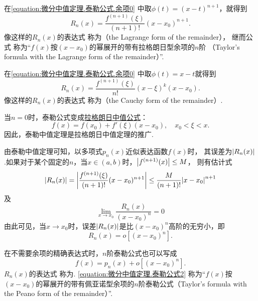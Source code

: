 在\cref{equation:微分中值定理.泰勒公式.余项0} 中取\(\phi(t) = (x-t)^{n+1}\)，就得到
\begin{equation}\label{equation:微分中值定理.泰勒公式.余项1}
R_n(x) = \frac{f^{(n+1)}(\xi)}{(n+1)!} (x-x_0)^{n+1}.
\end{equation}
像这样的\(R_n(x)\)的表达式 
称为（the Lagrange form of the remainder），
继而公式 
称为“\(f(x)\)按\((x-x_0)\)的幂展开的带有拉格朗日型余项的\(n\)阶
（Taylor's formula with the Lagrange form of the remainder）”.

在\cref{equation:微分中值定理.泰勒公式.余项0} 中取\(\phi(t) = x-t\)就得到
\begin{equation}\label{equation:微分中值定理.泰勒公式.余项4}
R_n(x) = \frac{f^{(n+1)}(\xi)}{n!} (x-\xi)^k (x-x_0).
\end{equation}
像这样的\(R_n(x)\)的表达式 
称为（the Cauchy form of the remainder）.

当\(n=0\)时，泰勒公式变成\hyperref[equation:微分中值定理.拉格朗日中值公式]{拉格朗日中值公式}：\[
	f(x) = f(x_0) + f'(\xi) (x-x_0), \quad x_0 < \xi < x.
\]
因此，泰勒中值定理是拉格朗日中值定理的推广.

由泰勒中值定理可知，以多项式\(p_n(x)\)近似表达函数\(f(x)\)时，
其误差为\(\abs{R_n(x)}\).如果对于某个固定的\(n\)，当\(x\in(a,b)\)时，\(\abs{f^{(n+1)}(x)} \leq M\)，
则有估计式\begin{equation}\label{equation:微分中值定理.泰勒公式.误差1}
\abs{R_n(x)}
= \abs{\frac{f^{(n+1)}(\xi)}{(n+1)!} (x-x_0)^{n+1}}
\leq \frac{M}{(n+1)!} \abs{x-x_0}^{n+1}
\end{equation}及\[
\lim\limits_{x \to x_0} \frac{R_n(x)}{(x-x_0)^n} = 0
\]由此可见，当\(x \to x_0\)时，误差\(\abs{R_n(x)}\)是比\((x-x_0)^n\)高阶的无穷小，即\begin{equation}\label{equation:微分中值定理.泰勒公式.余项2}
R_n(x) = o[(x-x_0)^n].
\end{equation}

在不需要余项的精确表达式时，\(n\)阶泰勒公式也可以写成
\begin{equation}\label{equation:微分中值定理.泰勒公式2}
f(x) = p_n(x) + o[(x - x_0)^n].
\end{equation}
\(R_n(x)\)的表达式  称为.
\cref{equation:微分中值定理.泰勒公式2} 称为“\(f(x)\)按\((x-x_0)\)的幂展开的带有佩亚诺型余项的\(n\)阶泰勒公式（Taylor's formula with the Peano form of the remainder）”.

